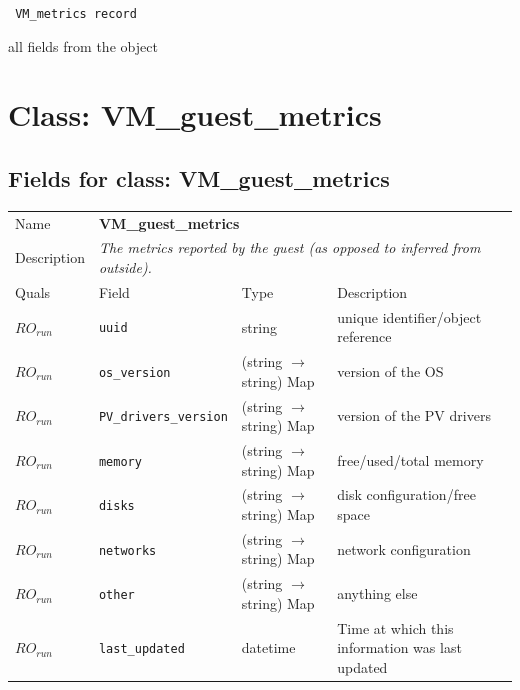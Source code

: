 \vspace{0.3cm}

{\tt 
VM\_metrics record
}


all fields from the object
\vspace{0.3cm}
\vspace{0.3cm}
\vspace{0.3cm}

\vspace{1cm}
\newpage
\section{Class: VM\_guest\_metrics}
\subsection{Fields for class: VM\_guest\_metrics}
\begin{longtable}{|lllp{}|}
\hline
\multicolumn{1}{|l}{Name} & \multicolumn{3}{l|}{\bf VM\_guest\_metrics} \\
\multicolumn{1}{|l}{Description} & \multicolumn{3}{l|}{\parbox{11cm}{\em
The metrics reported by the guest (as opposed to inferred from outside).}} \\
\hline
Quals & Field & Type & Description \\
\hline
$\mathit{RO}_\mathit{run}$ &  {\tt uuid} & string & unique identifier/object reference \\
$\mathit{RO}_\mathit{run}$ &  {\tt os\_version} & (string $\rightarrow$ string) Map & version of the OS \\
$\mathit{RO}_\mathit{run}$ &  {\tt PV\_drivers\_version} & (string $\rightarrow$ string) Map & version of the PV drivers \\
$\mathit{RO}_\mathit{run}$ &  {\tt memory} & (string $\rightarrow$ string) Map & free/used/total memory \\
$\mathit{RO}_\mathit{run}$ &  {\tt disks} & (string $\rightarrow$ string) Map & disk configuration/free space \\
$\mathit{RO}_\mathit{run}$ &  {\tt networks} & (string $\rightarrow$ string) Map & network configuration \\
$\mathit{RO}_\mathit{run}$ &  {\tt other} & (string $\rightarrow$ string) Map & anything else \\
$\mathit{RO}_\mathit{run}$ &  {\tt last\_updated} & datetime & Time at which this information was last updated \\
\hline
\end{longtable}
